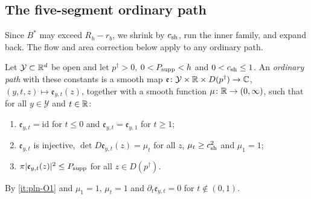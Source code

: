 \subsection{The five-segment ordinary path}\label{sec:pln-five}

Since $B^*$ may exceed $R_h-r_b$, we shrink by $c_{\rm sh}$, run the inner family, and expand back. The flow and area correction below apply to any ordinary path.

\begin{definition}\label{def:pln-ordinary-path}
Let $\mathcal Y\subset\mathbb{R}^d$ be open and let $p^\dagger>0$, $0<P_{\rm supp}<h$ and $0<c_{\rm sh}\le1$. An
\emph{ordinary path} with these constants is a smooth map
$\mathfrak e\colon\mathcal Y\times\mathbb{R}\times D(p^\dagger)\to\mathbb{C}$, $(y,t,z)\mapsto\mathfrak e_{y,t}(z)$, together with a smooth function
$\mu\colon\mathbb{R}\to(0,\infty)$, such that for all $y\in\mathcal Y$ and $t\in\mathbb{R}$:
\begin{enumerate}[label=(O\arabic*)]
\item\label{it:pln-O1} $\mathfrak e_{y,t}=\mathrm{id}$ for $t\le0$ and $\mathfrak e_{y,t}=\mathfrak e_{y,1}$ for $t\ge1$;
\item\label{it:pln-O2} $\mathfrak e_{y,t}$ is injective, $\det D\mathfrak e_{y,t}(z)=\mu_t$ for all $z$, $\mu_t\ge c_{\rm sh}^2$ and $\mu_1=1$;
\item\label{it:pln-O3} $\pi|\mathfrak e_{y,t}(z)|^2\le P_{\rm supp}$ for all $z\in D(p^\dagger)$.
\end{enumerate}
\end{definition}

By \ref{it:pln-O1} and $\mu_1=1$, $\mu_t=1$ and $\partial_t\mathfrak e_{y,t}=0$ for $t\notin(0,1)$.

